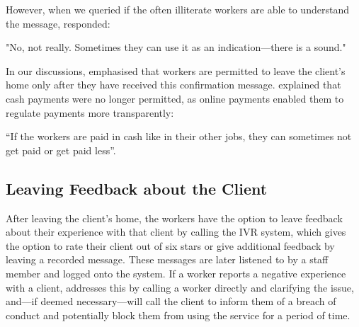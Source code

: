 However, when we queried if the often illiterate workers are able to understand the message, \PC{} responded:

\begin{displayquote}
"No, not really. Sometimes they can use it as an indication---there is a sound."
\end{displayquote}

In our discussions, \PC{} emphasised that workers are permitted to leave the client’s home only after they have received this confirmation message. \PC{} explained that cash payments were no longer permitted, as online payments enabled them to regulate payments more transparently:

\begin{displayquote}
“If the workers are paid in cash like in their other jobs, they can sometimes not get paid or get paid less”. 
\end{displayquote}


\subsection{Leaving Feedback about the Client}

After leaving the client’s home, the workers have the option to leave feedback about their experience with that client by calling the IVR system, which gives the option to rate their client out of six stars or give additional feedback by leaving a recorded message. These messages are later listened to by a \PC{} staff member and logged onto the system. If a worker reports a negative experience with a client, \PC{} addresses this by calling a worker directly and clarifying the issue, and---if deemed necessary---will call the client to inform them of a breach of conduct and potentially block them from using the service for a period of time. 